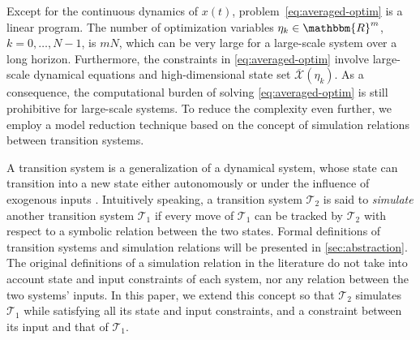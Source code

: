 Except for the continuous dynamics of $x (t)$, problem~\eqref{eq:averaged-optim} is a linear program. The number of optimization
variables $\eta_k \in \mathbbm{R}^m$, $k = 0, \ldots, N - 1$, is $mN$, which
can be very large for a large-scale system over a long horizon. Furthermore,
the constraints in \eqref{eq:averaged-optim} involve large-scale dynamical
equations and high-dimensional state set $\overbar{\mathcal{X}} (\eta_k)$. As
a consequence, the computational burden of solving \eqref{eq:averaged-optim}
is still prohibitive for large-scale systems. To reduce the complexity even
further, we employ a model reduction technique based on the concept of
simulation relations between transition systems.

A transition system is a generalization of a dynamical system, whose state can
transition into a new state either autonomously or under the influence of
exogenous inputs . Intuitively speaking, a
transition system $\mathcal{T}_2$ is said to {\emph{simulate}} another
transition system $\mathcal{T}_1$ if every move of $\mathcal{T}_1$ can be
tracked by $\mathcal{T}_2$ with respect to a symbolic relation between the two
states. Formal definitions of transition systems and simulation relations will
be presented in \cref{sec:abstraction}. The original definitions of a
simulation relation in the literature do not take into account state and input
constraints of each system, nor any relation between the two systems' inputs.
In this paper, we extend this concept so that $\mathcal{T}_2$ simulates
$\mathcal{T}_1$ while satisfying all its state and input constraints, and a
constraint between its input and that of $\mathcal{T}_1$.

